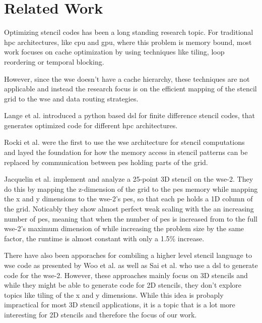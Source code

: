 \chapter{Related Work}
Optimizing stencil codes has been a long standing research topic.
For traditional \ac{hpc} architectures, like \ac{cpu} and \ac{gpu}, where this problem is memory bound, most work focuses on cache optimization by using techniques like tiling, loop reordering or temporal blocking.

However, since the \ac{wse} doesn't have a cache hierarchy, these techniques are not applicable and instead the research focus is on the efficient mapping of the stencil grid to the \ac{wse} and data routing strategies.

Lange et al. \cite{lange2016devito} introduced a python based \ac{dsl} for finite difference stencil codes, that generates optimized code for different \ac{hpc} architectures.

Rocki et al. \cite{rocki2020fast} were the first to use the \ac{wse} architecture for stencil computations and layed the foundation for how the memory access in stencil patterns can be replaced by communication between \ac{pe}s holding parts of the grid.

Jacquelin et al. \cite{jacquelin2022massively} implement and analyze a 25-point 3D stencil on the \ac{wse}-2.
They do this by mapping the z-dimension of the grid to the \ac{pe}s memory while mapping the x and y dimensions to the \ac{wse}-2's \ac{pe}s, so that each \ac{pe} holds a 1D column of the grid.
Noticably they show almost perfect weak scaling with the an increasing number of \ac{pe}s, meaning that when the number of \ac{pe}s is increased from  to the full \ac{wse}-2's maximum dimension of  while increasing the problem size by the same factor, the runtime is almost constant with only a 1.5\% increase.

There have also been apporaches for combiling a higher level stencil language to \ac{wse} code as presented by Woo et al. \cite{woo2022disruptive} as well as Sai et al. \cite{sai2024automated} who use a \ac{dsl} to generate code for the \ac{wse}-2. However, these approaches mainly focus on 3D stencils and while they might be able to generate code for 2D stencils, they don't explore topics like tiling of the x and y dimensions. While this idea is probaply impractical for most 3D stencil applications, it is a topic that is a lot more interesting for 2D stencils and therefore the focus of our work.